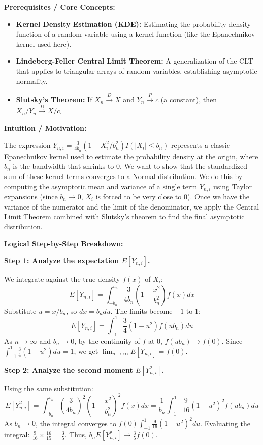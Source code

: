 \begin{solution}
\textbf{Prerequisites / Core Concepts:}
\begin{itemize}
    \item \textbf{Kernel Density Estimation (KDE):} Estimating the probability density function of a random variable using a kernel function (like the Epanechnikov kernel used here).
    \item \textbf{Lindeberg-Feller Central Limit Theorem:} A generalization of the CLT that applies to triangular arrays of random variables, establishing asymptotic normality.
    \item \textbf{Slutsky's Theorem:} If $X_n \xrightarrow{D} X$ and $Y_n \xrightarrow{P} c$ (a constant), then $X_n / Y_n \xrightarrow{D} X/c$.
\end{itemize}

\textbf{Intuition / Motivation:}

The expression $Y_{n,i} = \frac{3}{4b_n}(1 - X_i^2/b_n^2) I(|X_i| \leq b_n)$ represents a classic Epanechnikov kernel used to estimate the probability density at the origin, where $b_n$ is the bandwidth that shrinks to 0. We want to show that the standardized sum of these kernel terms converges to a Normal distribution. We do this by computing the asymptotic mean and variance of a single term $Y_{n,i}$ using Taylor expansions (since $b_n \to 0$, $X_i$ is forced to be very close to 0). Once we have the variance of the numerator and the limit of the denominator, we apply the Central Limit Theorem combined with Slutsky's theorem to find the final asymptotic distribution.

\textbf{Logical Step-by-Step Breakdown:}

\textbf{Step 1: Analyze the expectation $E[Y_{n,i}]$.}

We integrate against the true density $f(x)$ of $X_i$:
\[ E[Y_{n,i}] = \int_{-b_n}^{b_n} \frac{3}{4b_n} \left(1 - \frac{x^2}{b_n^2}\right) f(x) dx \]
Substitute $u = x/b_n$, so $dx = b_n du$. The limits become $-1$ to $1$:
\[ E[Y_{n,i}] = \int_{-1}^{1} \frac{3}{4} (1 - u^2) f(u b_n) du \]
As $n \to \infty$ and $b_n \to 0$, by the continuity of $f$ at 0, $f(u b_n) \to f(0)$.
Since $\int_{-1}^1 \frac{3}{4}(1-u^2)du = 1$, we get $\lim_{n \to \infty} E[Y_{n,i}] = f(0)$.

\textbf{Step 2: Analyze the second moment $E[Y_{n,i}^2]$.}

Using the same substitution:
\[ E[Y_{n,i}^2] = \int_{-b_n}^{b_n} \left(\frac{3}{4b_n}\right)^2 \left(1 - \frac{x^2}{b_n^2}\right)^2 f(x) dx = \frac{1}{b_n} \int_{-1}^{1} \frac{9}{16} (1 - u^2)^2 f(u b_n) du \]
As $b_n \to 0$, the integral converges to $f(0) \int_{-1}^1 \frac{9}{16} (1-u^2)^2 du$.
Evaluating the integral: $\frac{9}{16} \times \frac{16}{15} = \frac{3}{5}$.
Thus, $b_n E[Y_{n,i}^2] \to \frac{3}{5} f(0)$.


\end{solution}
